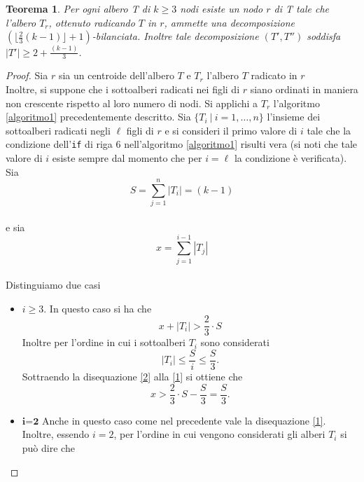 \newtheorem{teorema1}[definizione]{Teorema}
\begin{teorema1}
	\label{teorema1 cap3 sez1}
Per ogni albero T di $k \ge 3$ nodi esiste un nodo $r$ di T  tale che l'albero $T_r$, ottenuto radicando $T$ in $r$, ammette una decomposizione $ (\lfloor \frac{2}{3}(k-1) \rfloor + 1)$-bilanciata. Inoltre tale decomposizione $ (T',T'')$ soddisfa $ |T'| \ge 2+\frac{(k-1)}{3} $.
\end{teorema1}
\begin{proof}
	Sia $r$ sia un centroide dell'albero $ T $ e $T_r$ l'albero $ T $ radicato in $ r $ \\  	Inoltre, si suppone che i sottoalberi radicati nei figli di $r$ siano ordinati in maniera non crescente rispetto al loro numero di nodi. %
	Si applichi a $ T_r $ l'algoritmo \ref{algoritmo1} precedentemente descritto. Sia $ \{T_i \ | \  i=1,\dots,n\} $ l'insieme dei sottoalberi radicati negli $\ell$ figli di $ r $ e si consideri il primo valore di $ i $ tale che la condizione dell'\texttt{if} di riga $ 6 $ nell'algoritmo \ref{algoritmo1} risulti vera (si noti che tale valore di $ i $ esiste sempre dal momento che per $ i = \ell $ la condizione \`e verificata).
	Sia 
	\[ S = \sum_{j=1}^{n}{|T_i|} = (k-1 ) \]\\
	e sia
	\[ x = \sum_{j=1}^{i-1}{|T_j|} \]\\
	Distinguiamo due casi
	\begin{itemize}
	\item $i \ge 3$. In questo caso si ha che
	\begin{equation}\label{1}
		x+|T_i| > \frac{2}{3}\cdot S
	\end{equation}
	Inoltre per l'ordine in cui i sottoalberi $ T_i $ sono considerati
	\begin{equation}\label{2}
	|T_i| \le \frac{S}{i} \le \frac{S}{3}	.
	\end{equation}
	Sottraendo la disequazione \eqref{2} alla \eqref{1} si ottiene che 
	\begin{equation}\label{3}
	x > \frac{2}{3}\cdot S - \frac{S}{3} = \frac{S}{3}.
	\end{equation}
 	\item $ \textbf{i=2} $ Anche in questo caso come nel precedente vale la disequazione \eqref{1}.\\
 	Inoltre, essendo $ i = 2 $, per l'ordine in cui vengono considerati gli alberi $T_i$ si pu\`o dire che

\end{itemize}
\end{proof}
